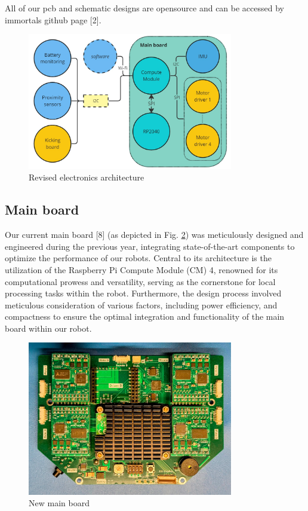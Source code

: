 \documentclass[runningheads]{llncs}
\begin{document}
All of our pcb and schematic designs are opensource and can be accessed by immortals github page [2].

\begin{figure}
	\centering
	\includegraphics[width=0.8\textwidth]{images/electronics-architecture.jpg}
	\caption{Revised electronics architecture}
	\label{fig:electronics-architecture}
\end{figure}

\subsection{Main board}

Our current main board [8] (as depicted in Fig. \ref{fig:main-board}) was meticulously designed and engineered during the previous year, integrating state-of-the-art components to optimize the performance of our robots. Central to its architecture is the utilization of the Raspberry Pi Compute Module (CM) 4, renowned for its computational prowess and versatility, serving as the cornerstone for local processing tasks within the robot. Furthermore, the design process involved meticulous consideration of various factors, including power efficiency, and compactness to ensure the optimal integration and functionality of the main board within our robot.


\begin{figure}
	\centering
	\includegraphics[width=0.8\textwidth]{images/main-board.jpg}
	\caption{New main board}
	\label{fig:main-board}
\end{figure}
\end{document}

